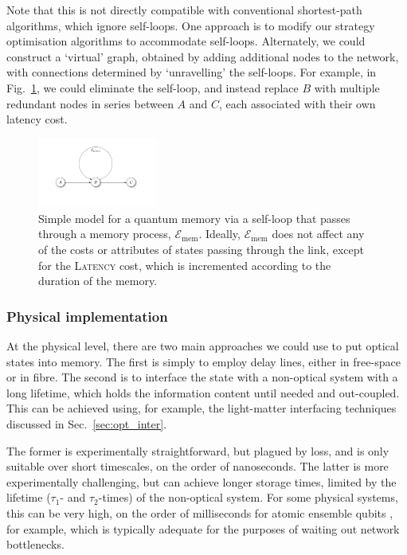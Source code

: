 Note that this is not directly compatible with conventional shortest-path algorithms, which ignore self-loops. One approach is to modify our strategy optimisation algorithms to accommodate self-loops. Alternately, we could construct a `virtual' graph, obtained by adding additional nodes to the network, with connections determined by `unravelling' the self-loops. For example, in Fig.~\ref{fig:memory}, we could eliminate the self-loop, and instead replace $B$ with multiple redundant nodes in series between $A$ and $C$, each associated with their own latency cost.

\begin{figure}[htpb]
\includegraphics[width=0.35\textwidth]{memory}
\caption{Simple model for a quantum memory via a self-loop that passes through a memory process, $\mathcal{E}_\mathrm{mem}$. Ideally, $\mathcal{E}_\mathrm{mem}$ does not affect any of the costs or attributes of states passing through the link, except for the \textsc{Latency} cost, which is incremented according to the duration of the memory.} \label{fig:memory}
\end{figure}

%
%

\subsubsection{Physical implementation}

At the physical level, there are two main approaches we could use to put optical states into memory. The first is simply to employ delay lines, either in free-space or in fibre. The second is to interface the state with a non-optical system with a long lifetime, which holds the information content until needed and out-coupled. This can be achieved using, for example, the light-matter interfacing techniques discussed in Sec.~\ref{sec:opt_inter}.

The former is experimentally straightforward, but plagued by loss, and is only suitable over short timescales, on the order of nanoseconds. The latter is more experimentally challenging, but can achieve longer storage times, limited by the lifetime ($\tau_1$- and $\tau_2$-times) of the non-optical system. For some physical systems, this can be very high, on the order of milliseconds for atomic ensemble qubits \cite{bib:Duan01, bib:Duan02, bib:LauratKimble07}, for example, which is typically adequate for the purposes of waiting out network bottlenecks.


